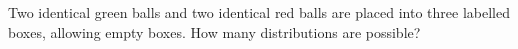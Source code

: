 Two identical green balls and two identical red balls are placed into three labelled boxes, allowing empty boxes. How many distributions are possible?

